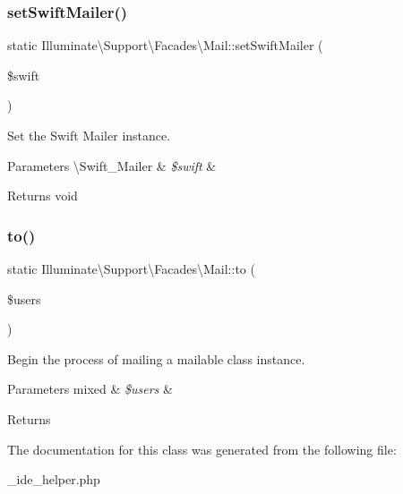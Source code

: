 \subsubsection{\texorpdfstring{set\+Swift\+Mailer()}{setSwiftMailer()}}
{\footnotesize\ttfamily static Illuminate\textbackslash{}\+Support\textbackslash{}\+Facades\textbackslash{}\+Mail\+::set\+Swift\+Mailer (\begin{DoxyParamCaption}\item[{}]{\$swift }\end{DoxyParamCaption})\hspace{0.3cm}{\ttfamily [static]}}

Set the Swift Mailer instance.


\begin{DoxyParams}[1]{Parameters}
\textbackslash{}\+Swift\+\_\+\+Mailer & {\em \$swift} & \\
\hline
\end{DoxyParams}
\begin{DoxyReturn}{Returns}
void 
\end{DoxyReturn}
\mbox{\label{class_illuminate_1_1_support_1_1_facades_1_1_mail_afbe8a912037dc180cfbd366144eb3a1f}} 
\subsubsection{\texorpdfstring{to()}{to()}}
{\footnotesize\ttfamily static Illuminate\textbackslash{}\+Support\textbackslash{}\+Facades\textbackslash{}\+Mail\+::to (\begin{DoxyParamCaption}\item[{}]{\$users }\end{DoxyParamCaption})\hspace{0.3cm}{\ttfamily [static]}}

Begin the process of mailing a mailable class instance.


\begin{DoxyParams}[1]{Parameters}
mixed & {\em \$users} & \\
\hline
\end{DoxyParams}
\begin{DoxyReturn}{Returns}

\end{DoxyReturn}


The documentation for this class was generated from the following file\+:\begin{DoxyCompactItemize}
\item 
\+\_\+ide\+\_\+helper.\+php\end{DoxyCompactItemize}
